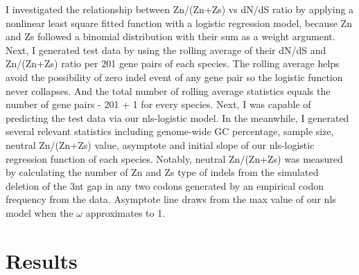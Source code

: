 I investigated the relationship between Zn/(Zn+Zs) vs dN/dS ratio by applying a nonlinear least square fitted function with a logistic regression model, because Zn and Zs followed a binomial distribution with their sum as a weight argument. Next, I generated test data by using the rolling average of their dN/dS and Zn/(Zn+Zs) ratio per 201 gene pairs of each species. The rolling average helps avoid the possibility of zero indel event of any gene pair so the logistic function never collapses. And the total number of rolling average statistics equals the number of gene pairs - 201 + 1 for every species. Next, I was capable of predicting the test data via our nls-logistic model. In the meanwhile, I generated several relevant statistics including genome-wide GC percentage, sample size, neutral Zn/(Zn+Zs) value, asymptote and initial slope of our nls-logistic regression function of each species. Notably, neutral Zn/(Zn+Zs) was measured by calculating the number of Zn and Zs type of indels from the simulated deletion of the 3nt gap in any two codons generated by an empirical codon frequency from the data. Asymptote line draws from the max value of our nls model when the $\omega$ approximates to 1.  


\section{Results}
